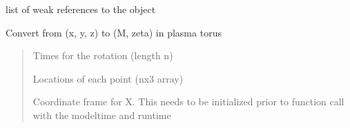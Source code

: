 \documentclass[letterpaper,10pt,english]{sphinxmanual}
\begin{document}
\begin{fulllineitems}

\begin{fulllineitems}
\label{\detokenize{nexoclom2/nexoclom2.solarsystem.IoTorus:nexoclom2.solarsystem.IoTorus.IoTorus.__weakref__}}
\pysigstartsignatures
\pysigline
{}
\pysigstopsignatures
\sphinxAtStartPar
list of weak references to the object

\end{fulllineitems}


\begin{fulllineitems}
\label{\detokenize{nexoclom2/nexoclom2.solarsystem.IoTorus:nexoclom2.solarsystem.IoTorus.IoTorus.n_and_T}}
\pysigstartsignatures
\pysiglinewithargsret
{}
{\sphinxparamcomma {}\sphinxparamcomma {}\sphinxparamcomma {}}
{}
\pysigstopsignatures
\end{fulllineitems}


\begin{fulllineitems}
\label{\detokenize{nexoclom2/nexoclom2.solarsystem.IoTorus:nexoclom2.solarsystem.IoTorus.IoTorus.xyz_to_Mzeta}}
\pysigstartsignatures
\pysiglinewithargsret
{}
{\sphinxparamcomma {}\sphinxparamcomma {}}
{}
\pysigstopsignatures
\sphinxAtStartPar
Convert from (x, y, z) to (M, zeta) in plasma torus
\begin{quote}\begin{description}
\begin{description}
\sphinxAtStartPar
Times for the rotation (length n)

\sphinxAtStartPar
Locations of each point (nx3 array)

\sphinxAtStartPar
Coordinate frame for X. This needs to be initialized prior to
function call with the modeltime and runtime

\end{description}

\end{description}\end{quote}

\end{fulllineitems}


\end{fulllineitems}
\end{document}
